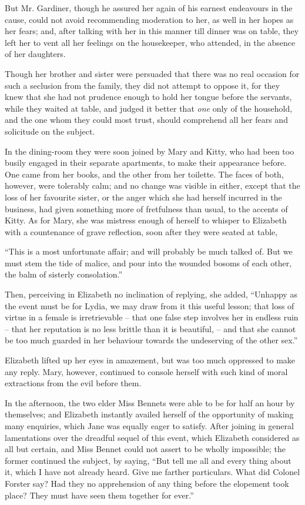 But Mr. Gardiner, though he assured her again of his
earnest endeavours in the cause, could not avoid recommending
moderation to her, as well in her hopes as her
fears; and, after talking with her in this manner till
dinner was on table, they left her to vent all her feelings
on the housekeeper, who attended, in the absence of her
daughters.

Though her brother and sister were persuaded that
there was no real occasion for such a seclusion from the
family, they did not attempt to oppose it, for they knew
that she had not prudence enough to hold her tongue
before the servants, while they waited at table, and
judged it better that \textit{one} only of the household, and the
one whom they could most trust, should comprehend all
her fears and solicitude on the subject.

In the dining-room they were soon joined by Mary and
Kitty, who had been too busily engaged in their separate
apartments, to make their appearance before. One came
from her books, and the other from her toilette. The
faces of both, however, were tolerably calm; and no
change was visible in either, except that the loss of her
favourite sister, or the anger which she had herself incurred
in the business, had given something more of fretfulness
than usual, to the accents of Kitty. As for Mary, she was
mistress enough of herself to whisper to Elizabeth with
a countenance of grave reflection, soon after they were
seated at table,

“This is a most unfortunate affair; and will probably
be much talked of. But we must stem the tide of malice,
and pour into the wounded bosoms of each other, the
balm of sisterly consolation.”

Then, perceiving in Elizabeth no inclination of replying,
she added, “Unhappy as the event must be for Lydia,
we may draw from it this useful lesson; that loss of
virtue in a female is irretrievable -- that one false step
involves her in endless ruin -- that her reputation is no
less brittle than it is beautiful, -- and that she cannot be
too much guarded in her behaviour towards the undeserving
of the other sex.”

Elizabeth lifted up her eyes in amazement, but was too
much oppressed to make any reply. Mary, however,
continued to console herself with such kind of moral
extractions from the evil before them.

In the afternoon, the two elder Miss Bennets were able
to be for half an hour by themselves; and Elizabeth
instantly availed herself of the opportunity of making many
enquiries, which Jane was equally eager to satisfy. After
joining in general lamentations over the dreadful sequel
of this event, which Elizabeth considered as all but
certain, and Miss Bennet could not assert to be wholly
impossible; the former continued the subject, by saying,
“But tell me all and every thing about it, which I have
not already heard. Give me farther particulars. What
did Colonel Forster say? Had they no apprehension of
any thing before the elopement took place? They must
have seen them together for ever.”


